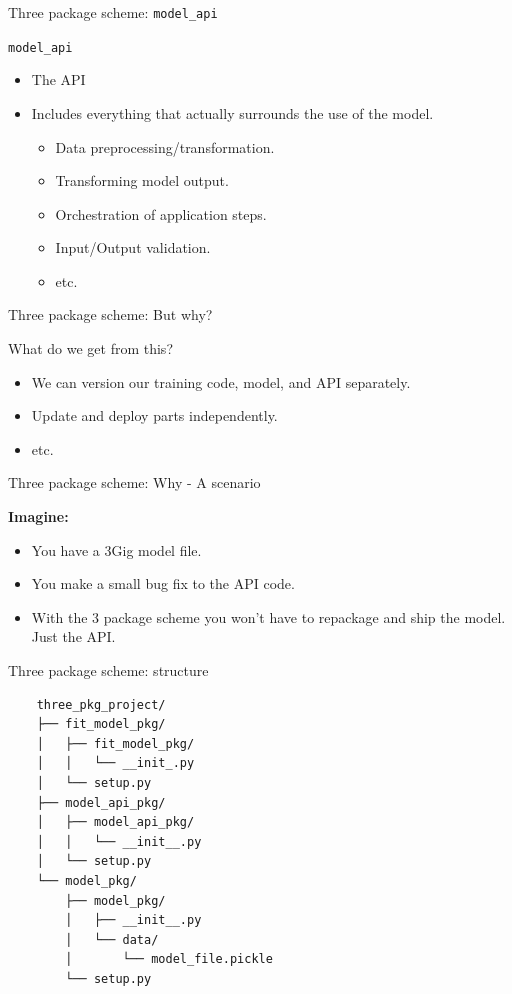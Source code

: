 \documentclass[10pt]{beamer}
\begin{document}
\begin{frame}[fragile]{Three package scheme: \texttt{model\_api}}

  \texttt{model\_api}
  \begin{itemize}
    \item The API
    \item Includes everything that actually surrounds the use of the model.
      \begin{itemize}
        \item Data preprocessing/transformation.
        \item Transforming model output.
        \item Orchestration of application steps.
        \item Input/Output validation.
        \item etc.
      \end{itemize}
  \end{itemize} 

\end{frame}

\begin{frame}[fragile]{Three package scheme: But why?}

  What do we get from this?
  \begin{itemize}
    \item We can version our training code, model, and API separately.
    \item Update and deploy parts independently.
    \item etc.
  \end{itemize}
\end{frame}

\begin{frame}[fragile]{Three package scheme: Why - A scenario}

  \textbf{Imagine:}
  \begin{itemize} 
    \item You have a 3Gig model file.
    \item You make a small bug fix to the API code.
    \item With the 3 package scheme you won't have to repackage and ship the model. Just the API.
  \end{itemize}
\end{frame}

\begin{frame}[fragile]{Three package scheme: structure}

  \begin{verbatim}
    three_pkg_project/
    ├── fit_model_pkg/
    │   ├── fit_model_pkg/
    │   │   └── __init_.py
    │   └── setup.py
    ├── model_api_pkg/
    │   ├── model_api_pkg/
    │   │   └── __init__.py
    │   └── setup.py
    └── model_pkg/
        ├── model_pkg/
        │   ├── __init__.py
        │   └── data/
        │       └── model_file.pickle
        └── setup.py
  \end{verbatim}

\end{frame}
\end{document}
